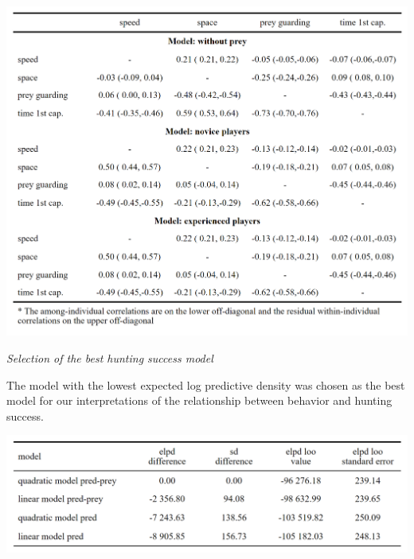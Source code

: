 \documentclass[
  11pt,
]{article}
\let\origfigure\figure
\let\endorigfigure\endfigure
\renewenvironment{figure}[1][2] {
    \expandafter\origfigure\expandafter[H]
} {
    \endorigfigure
}
\begin{document}
\begin{figure}
\centering
\caption*{\textbf{Table S3:} Among-individual and within-individual behavioral correlations for the three additional multivariate mixed-models.}
\includegraphics[width = \linewidth]{tableS3.png}
\end{figure}

\newpage

\begin{center}
\emph{Selection of the best hunting success model}
\end{center}

The model with the lowest expected log predictive density was chosen as
the best model for our interpretations of the relationship between
behavior and hunting success.

\begin{figure}
\centering
\caption*{\textbf{Table S4:} Summary table comparing the hunting success models based on approximate leave-one-out cross-validation}
\includegraphics[width = \linewidth]{tableS4.png}
\end{figure}

\newpage
\end{document}
